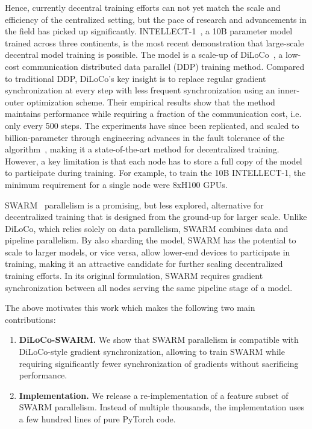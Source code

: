 \documentclass{article}
\begin{document}
Hence, currently decentral training efforts can not yet match the scale and
efficiency of the centralized setting, but the pace of research and advancements
in the field has picked up significantly. INTELLECT-1~\cite{intellect1}, a 10B
parameter model trained across three continents, is the most recent
demonstration that large-scale decentral model training is possible. The model
is a scale-up of DiLoCo~\cite{douillard2023}, a low-cost communication
distributed data parallel (DDP) training method. Compared to traditional DDP,
DiLoCo's key insight is to replace regular gradient synchronization at every
step with less frequent synchronization using an inner-outer optimization
scheme. Their empirical results show that the method maintains performance while
requiring a fraction of the communication cost, i.e. only every 500 steps.  The
experiments have since been replicated, and scaled to billion-parameter through
engineering advances in the fault tolerance of the
algorithm~\cite{jaghouar2024,intellect1}, making it a state-of-the-art method
for decentralized training. However, a key limitation is that each node has to
store a full copy of the model to participate during training. For example, to
train the 10B INTELLECT-1, the minimum requirement for a single node were 8xH100
GPUs.

SWARM~\cite{ryabinin2023} parallelism is a promising, but less explored,
alternative for decentralized training that is designed from the ground-up for
larger scale. Unlike DiLoCo, which relies solely on data parallelism, SWARM
combines data and pipeline parallelism. By also sharding the model, SWARM has
the potential to scale to larger models, or vice versa, allow lower-end devices
to participate in training, making it an attractive candidate for further
scaling decentralized training efforts. In its original formulation, SWARM
requires gradient synchronization between all nodes serving the same pipeline
stage of a model.

The above motivates this work which makes the following two main contributions:


\begin{enumerate}
  \item \textbf{DiLoCo-SWARM.} We show that SWARM parallelism is compatible with
  DiLoCo-style gradient synchronization, allowing to train SWARM while requiring 
  significantly fewer synchronization of gradients without sacrificing performance.
  \item \textbf{Implementation.} We release a re-implementation
  of a feature subset of SWARM parallelism. Instead of multiple thousands, the
  implementation uses a few hundred lines of pure PyTorch code.
\end{enumerate}
\end{document}
